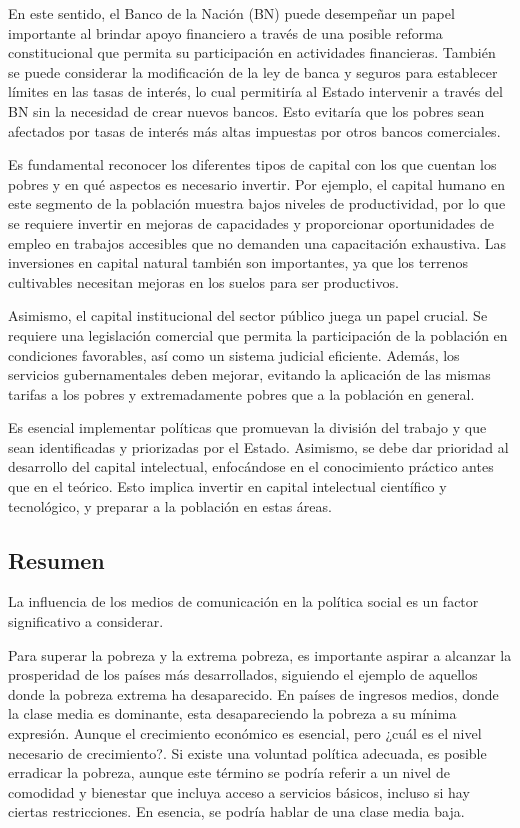 \documentclass[
  a4paper,
]{article}
\begin{document}
En este sentido, el Banco de la Nación (BN) puede desempeñar un papel
importante al brindar apoyo financiero a través de una posible reforma
constitucional que permita su participación en actividades financieras.
También se puede considerar la modificación de la ley de banca y seguros
para establecer límites en las tasas de interés, lo cual permitiría al
Estado intervenir a través del BN sin la necesidad de crear nuevos
bancos. Esto evitaría que los pobres sean afectados por tasas de interés
más altas impuestas por otros bancos comerciales.

Es fundamental reconocer los diferentes tipos de capital con los que
cuentan los pobres y en qué aspectos es necesario invertir. Por ejemplo,
el capital humano en este segmento de la población muestra bajos niveles
de productividad, por lo que se requiere invertir en mejoras de
capacidades y proporcionar oportunidades de empleo en trabajos
accesibles que no demanden una capacitación exhaustiva. Las inversiones
en capital natural también son importantes, ya que los terrenos
cultivables necesitan mejoras en los suelos para ser productivos.

Asimismo, el capital institucional del sector público juega un papel
crucial. Se requiere una legislación comercial que permita la
participación de la población en condiciones favorables, así como un
sistema judicial eficiente. Además, los servicios gubernamentales deben
mejorar, evitando la aplicación de las mismas tarifas a los pobres y
extremadamente pobres que a la población en general.

Es esencial implementar políticas que promuevan la división del trabajo
y que sean identificadas y priorizadas por el Estado. Asimismo, se debe
dar prioridad al desarrollo del capital intelectual, enfocándose en el
conocimiento práctico antes que en el teórico. Esto implica invertir en
capital intelectual científico y tecnológico, y preparar a la población
en estas áreas.

\subsection{Resumen}\label{resumen-1}

La influencia de los medios de comunicación en la política social es un
factor significativo a considerar.

Para superar la pobreza y la extrema pobreza, es importante aspirar a
alcanzar la prosperidad de los países más desarrollados, siguiendo el
ejemplo de aquellos donde la pobreza extrema ha desaparecido. En países
de ingresos medios, donde la clase media es dominante, esta
desapareciendo la pobreza a su mínima expresión. Aunque el crecimiento
económico es esencial, pero ¿cuál es el nivel necesario de crecimiento?.
Si existe una voluntad política adecuada, es posible erradicar la
pobreza, aunque este término se podría referir a un nivel de comodidad y
bienestar que incluya acceso a servicios básicos, incluso si hay ciertas
restricciones. En esencia, se podría hablar de una clase media baja.
\end{document}
